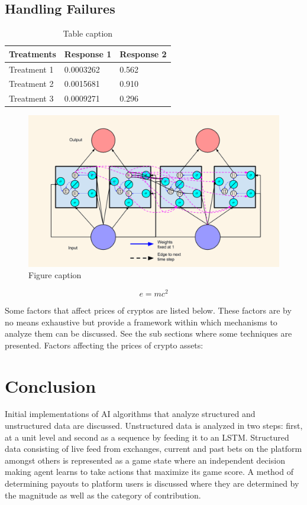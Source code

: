 \documentclass[preprint,12pt]{elsarticle}
\begin{document}
\subsection{Handling Failures}

\begin{table}[h]
\centering
\begin{tabular}{l l l}
\hline
\textbf{Treatments} & \textbf{Response 1} & \textbf{Response 2}\\
\hline
Treatment 1 & 0.0003262 & 0.562 \\
Treatment 2 & 0.0015681 & 0.910 \\
Treatment 3 & 0.0009271 & 0.296 \\
\hline
\end{tabular}
\caption{Table caption}
\end{table}

\begin{figure}[h]
\centering\includegraphics[width=0.4\linewidth]{placeholder}
\caption{Figure caption}
\end{figure}

\begin{equation}
\label{eq:emc}
e = mc^2
\end{equation}

Some factors that affect prices of cryptos are listed below. These factors are by no means exhaustive but provide a framework within which mechanisms to analyze them can be discussed. See the sub sections where some techniques are presented.
Factors affecting the prices of crypto assets:

\section{Conclusion}
Initial implementations of AI algorithms that analyze structured and unstructured data are discussed. Unstructured data is analyzed in two steps: first, at a unit level and second as a sequence by feeding it to an LSTM. Structured data consisting of live feed from exchanges, current and past bets on the platform amongst others is represented as a game state where an independent decision making agent learns to take actions that maximize its game score. A method of determining payouts to platform users is discussed where they are determined by the magnitude as well as the category of contribution.




\end{document}

